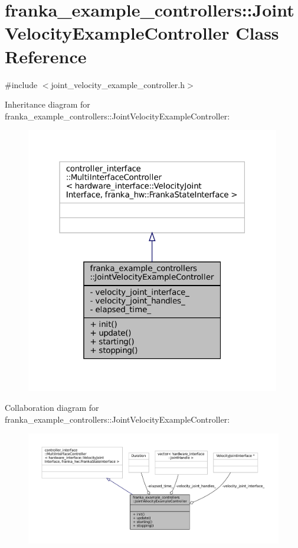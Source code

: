 \hypertarget{classfranka__example__controllers_1_1JointVelocityExampleController}{}\section{franka\+\_\+example\+\_\+controllers\+:\+:Joint\+Velocity\+Example\+Controller Class Reference}
\label{classfranka__example__controllers_1_1JointVelocityExampleController}


{\ttfamily \#include $<$joint\+\_\+velocity\+\_\+example\+\_\+controller.\+h$>$}



Inheritance diagram for franka\+\_\+example\+\_\+controllers\+:\+:Joint\+Velocity\+Example\+Controller\+:
\nopagebreak
\begin{figure}[H]
\begin{center}
\leavevmode
\includegraphics[width=315pt]{classfranka__example__controllers_1_1JointVelocityExampleController__inherit__graph}
\end{center}
\end{figure}


Collaboration diagram for franka\+\_\+example\+\_\+controllers\+:\+:Joint\+Velocity\+Example\+Controller\+:
\nopagebreak
\begin{figure}[H]
\begin{center}
\leavevmode
\includegraphics[width=350pt]{classfranka__example__controllers_1_1JointVelocityExampleController__coll__graph}
\end{center}
\end{figure}
